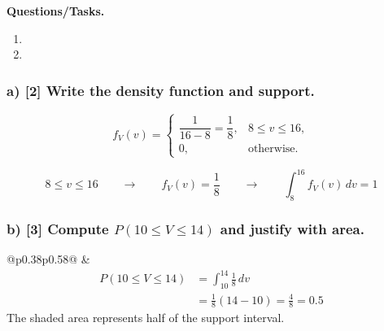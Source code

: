\textbf{Questions/Tasks.}
\begin{enumerate}[label=\textbf{\alph*)}]
    \item {}
    \item {}
\end{enumerate}

\subsubsection*{a) [2] Write the density function and support.}
\label{subsec:example-uniform-investment-plan-c1-a}
\[
f_V(v)=\begin{cases}
\dfrac{1}{16-8}=\dfrac18, & 8\le v\le 16,\\
0, & \text{otherwise.}
\end{cases}
\]

\[
8\le v\le 16
\qquad \longrightarrow \qquad
f_V(v)=\frac18
\qquad \longrightarrow \qquad
\int_8^{16} f_V(v)\,dv=1
\]


\subsubsection*{b) [3] Compute $P(10\le V\le 14)$ and justify with area.}
\label{subsec:example-uniform-investment-plan-c1-b}
\begin{center}
    \setlength{\tabcolsep}{3pt}
    \renewcommand{\arraystretch}{1.08}
    \begin{tabular}{@{}p{}p{}@{}}
        \centering
         &
        \[
        \begin{aligned}
        P(10\le V\le 14)
        &=\int_{10}^{14} \frac18\,dv\\
        &=\frac18(14-10)=\frac48=0.5
        \end{aligned}
        \]
        The shaded area represents half of the support interval.
    \end{tabular}
\end{center}


